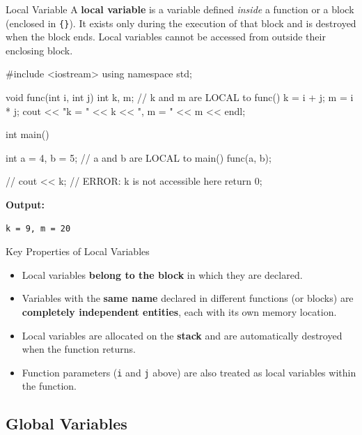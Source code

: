 \begin{definitionbox}{Local Variable}
A \textbf{local variable} is a variable defined \emph{inside} a function or a
block (enclosed in \texttt{\{\}}). It exists only during the execution of that
block and is destroyed when the block ends. Local variables cannot be accessed
from outside their enclosing block.
\end{definitionbox}

\begin{cppcode}
#include <iostream>
using namespace std;

void func(int i, int j)
{
    int k, m;         // k and m are LOCAL to func()
    k = i + j;
    m = i * j;
    cout << "k = " << k << ", m = " << m << endl;
}

int main()
{
    int a = 4, b = 5; // a and b are LOCAL to main()
    func(a, b);

    // cout << k;  // ERROR: k is not accessible here
    return 0;
}
\end{cppcode}

\noindent\textbf{Output:}
\begin{verbatim}
k = 9, m = 20
\end{verbatim}

\begin{infobox}{Key Properties of Local Variables}
\begin{itemize}
    \item Local variables \textbf{belong to the block} in which they are
          declared.
    \item Variables with the \textbf{same name} declared in different
          functions (or blocks) are \textbf{completely independent entities},
          each with its own memory location.
    \item Local variables are allocated on the \textbf{stack} and are
          automatically destroyed when the function returns.
    \item Function parameters (\texttt{i} and \texttt{j} above) are also
          treated as local variables within the function.
\end{itemize}
\end{infobox}

\subsection{Global Variables}
\label{subsec:global-variables}

